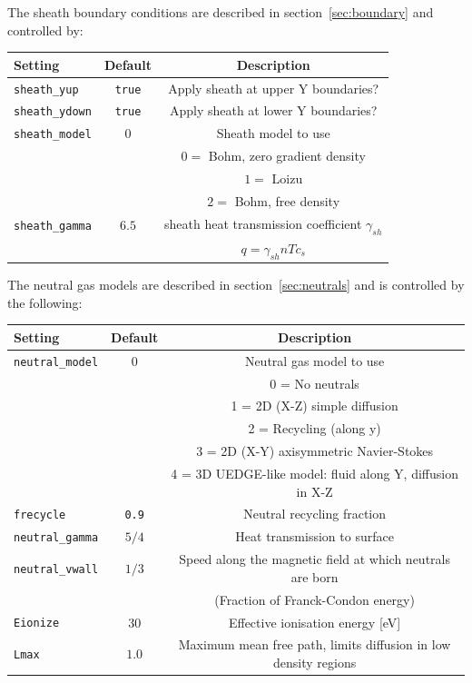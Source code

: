 \documentclass[12pt,a4paper]{article}
\begin{document}
The sheath boundary conditions are described in section~\ref{sec:boundary} and controlled by:
\begin{center}
\begin{tabular}{l c c}
  Setting & Default & Description \\
  \hline
  \texttt{sheath\_yup} & \texttt{true} & Apply sheath at upper Y boundaries? \\
  \texttt{sheath\_ydown} & \texttt{true} & Apply sheath at lower Y boundaries? \\
  \texttt{sheath\_model} & $0$ & Sheath model to use \\
  &     & $0 = $ Bohm, zero gradient density \\
  &     & $1 = $ Loizu \\
  &     & $2 = $ Bohm, free density \\
  \texttt{sheath\_gamma} & $6.5$ & sheath heat transmission coefficient $\gamma_{sh}$\\
  & & $q = \gamma_{sh}nTc_s$ \\
  \hline
\end{tabular}
\end{center}

The neutral gas models are described in section~\ref{sec:neutrals} and is controlled by the following:
\begin{center}
\begin{tabular}{l c c}
  Setting & Default & Description \\
  \hline
  \texttt{neutral\_model} & $0$ & Neutral gas model to use \\
  & & 0 = No neutrals \\
  & & 1 = 2D (X-Z) simple diffusion \\
  & & 2 = Recycling (along y) \\
  & & 3 = 2D (X-Y) axisymmetric Navier-Stokes \\
  & & 4 = 3D UEDGE-like model: fluid along Y, diffusion in X-Z \\
  \texttt{frecycle} & \texttt{0.9} & Neutral recycling fraction \\
  \texttt{neutral\_gamma} & $5/4$ & Heat transmission to surface \\
  \texttt{neutral\_vwall} & $1/3$ & Speed along the magnetic field at which neutrals are born \\
  & & (Fraction of Franck-Condon energy) \\
  \texttt{Eionize} & $30$ & Effective ionisation energy [eV] \\
  \texttt{Lmax} & $1.0$ & Maximum mean free path, limits diffusion in low density regions \\
  \hline
\end{tabular}
\end{center}
\end{document}
